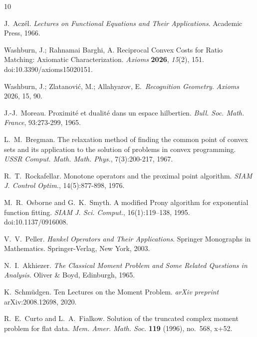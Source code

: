 \documentclass[11pt,reqno]{amsart}
\theoremstyle{definition}
\theoremstyle{remark}
\newcommand{\1}{\mathbf{1}}
\begin{document}
\begin{thebibliography}{10}

J.~Acz\'el.
\newblock \emph{Lectures on Functional Equations and Their Applications}.
\newblock Academic Press, 1966.

Washburn, J.; Rahnamai Barghi, A.
\newblock Reciprocal Convex Costs for Ratio Matching: Axiomatic Characterization.
\newblock \emph{Axioms} \textbf{2026}, \emph{15}(2), 151. doi:10.3390/axioms15020151.

Washburn, J.; Zlatanovi\'c, M.; Allahyarov, E.\ \emph{Recognition Geometry}. \emph{Axioms} 2026, 15, 90.

J.-J.~Moreau.
\newblock Proximit\'e et dualit\'e dans un espace hilbertien.
\newblock \emph{Bull. Soc. Math. France}, 93:273-299, 1965.

L.~M.~Bregman.
\newblock The relaxation method of finding the common point of convex sets and its application to the solution of problems in convex programming.
\newblock \emph{USSR Comput. Math. Math. Phys.}, 7(3):200-217, 1967.

R.~T.~Rockafellar.
\newblock Monotone operators and the proximal point algorithm.
\newblock \emph{SIAM J. Control Optim.}, 14(5):877-898, 1976.


M.~R.~Osborne and G.~K.~Smyth.
\newblock A modified {P}rony algorithm for exponential function fitting.
\newblock \emph{SIAM J. Sci. Comput.}, 16(1):119--138, 1995. doi:10.1137/0916008.

V.~V.~Peller.
\newblock \emph{Hankel Operators and Their Applications}.
\newblock Springer Monographs in Mathematics. Springer-Verlag, New York, 2003.



N.~I.~Akhiezer.
\newblock \emph{The Classical Moment Problem and Some Related Questions in Analysis}.
\newblock Oliver \& Boyd, Edinburgh, 1965.

K.~Schm{\"u}dgen.
\newblock Ten Lectures on the Moment Problem.
\newblock \emph{arXiv preprint} arXiv:2008.12698, 2020.

R.~E.~Curto and L.~A.~Fialkow.
\newblock Solution of the truncated complex moment problem for flat data.
\newblock \emph{Mem. Amer. Math. Soc.} \textbf{119} (1996), no.~568, x+52.

\end{thebibliography}
\end{document}
